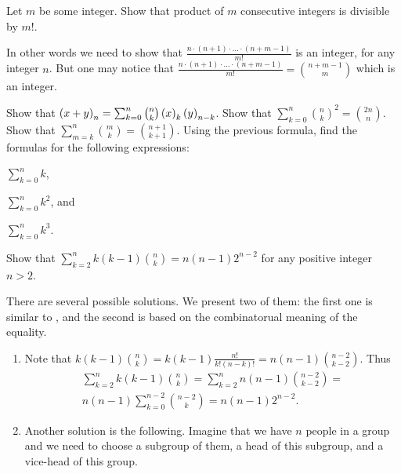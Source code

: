 \begin{chapterendexercises}
  \exercise Let $m$ be some integer. Show that product of $m$ consecutive
    integers is divisible by $m!$.
    \begin{solution}
     In other words we need to show that 
     $\frac{n \cdot (n + 1) \cdot \dots \cdot (n + m - 1)}{m!}$ is an integer,
     for any integer $n$. But one may notice that 
     $\frac{n \cdot (n + 1) \cdot \dots \cdot (n + m - 1)}{m!} = 
      \binom{n + m - 1}{m}$ which is an integer.
    \end{solution}
  \exercise Show that
    $\numberOfPermutations[n]{x + y} = \sum_{k = 0}^n \binom{n}{k}
      \numberOfPermutations[k]{x} \numberOfPermutations[n - k]{y}$.
  \exercise Show that
    $\sum_{k = 0}^n \binom{n}{k}^2 = \binom{2n}{n}$.
  \exercise Show that $\sum_{m = k}^n \binom{m}{k} =
    \binom{n + 1}{k + 1}$.
  \exercise Using the previous formula, find the formulas for the following
    expressions:
    \begin{enumerate*}
      \item $\sum_{k = 0}^n k$,
      \item $\sum_{k = 0}^n k^2$, and
      \item $\sum_{k = 0}^n k^3$.
    \end{enumerate*}

  \exercise Show that 
    $\sum_{k = 2}^n k (k - 1) \binom{n}{k} = n (n - 1) 2^{n - 2}$ for any
    positive integer $n > 2$.
    \begin{solution}
      There are several possible solutions. We present two of them: the first
      one is similar to , and the second is
      based on the combinatorual meaning of the equality.
      \begin{enumerate}
        \item Note that $k (k - 1) \binom{n}{k} = 
          k (k - 1) \frac{n!}{k! (n - k)!} = n (n - 1) \binom{n - 2}{k - 2}$.
          Thus
          \begin{multline*}
            \sum_{k = 2}^n k (k - 1) \binom{n}{k} =
            \sum_{k = 2}^n n (n - 1) \binom{n - 2}{k - 2} =  \\
              n (n - 1) \sum_{k = 0}^{n - 2} \binom{n - 2}{k} = 
              n (n - 1) 2^{n - 2}.
          \end{multline*}
        \item Another solution is the following. Imagine that we have $n$ people in a
          group and we need to choose a subgroup of them, a head of this subgroup, and
          a vice-head of this group.


\end{enumerate}
\end{solution}
\end{chapterendexercises}
